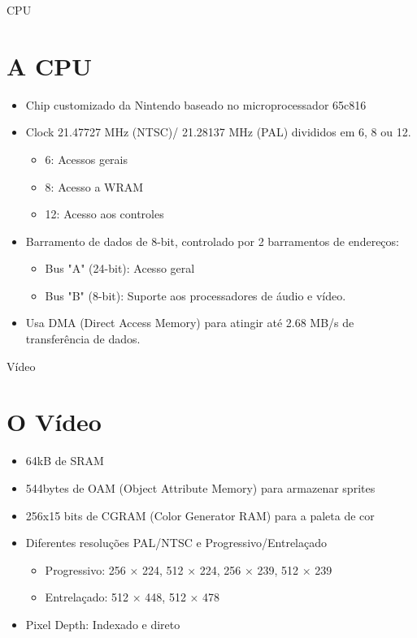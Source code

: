 \documentclass[xcolor=svgnames,handout]{beamer}
\begin{document}
\begin{frame}{CPU}
\section{A CPU}
  \begin{itemize}
    \item{Chip customizado da Nintendo baseado no microprocessador 65c816}
    \item{Clock 21.47727 MHz (NTSC)/ 21.28137 MHz (PAL) divididos em 6, 8 ou 12.}
    \begin{itemize}
      \item{6:  Acessos gerais}
      \item{8:  Acesso a WRAM}
      \item{12: Acesso aos controles}
    \end{itemize}
    \item{Barramento de dados de 8-bit, controlado por 2 barramentos de endereços:}
    \begin{itemize}
      \item{Bus "A" (24-bit): Acesso geral}
      \item{Bus "B" (8-bit): Suporte aos processadores de áudio e vídeo.}
    \end{itemize}
    \item{Usa DMA (Direct Access Memory) para atingir até 2.68 MB/s de transferência de dados.}
  \end{itemize}
\end{frame}


\begin{frame}{Vídeo}
\section{O Vídeo}
    \begin{itemize}
      \item{64kB de SRAM}
      \item{544bytes de OAM (Object Attribute Memory) para armazenar sprites}
      \item{256x15 bits de CGRAM (Color Generator RAM) para a paleta de cor}
      \item{Diferentes resoluções PAL/NTSC e Progressivo/Entrelaçado}
      \begin{itemize}
        \item{Progressivo: 256 × 224, 512 × 224, 256 × 239, 512 × 239}
        \item{Entrelaçado: 512 × 448, 512 × 478}
      \end{itemize}
      \item{Pixel Depth: Indexado e direto}
    \end{itemize}
\end{frame}
\end{document}
